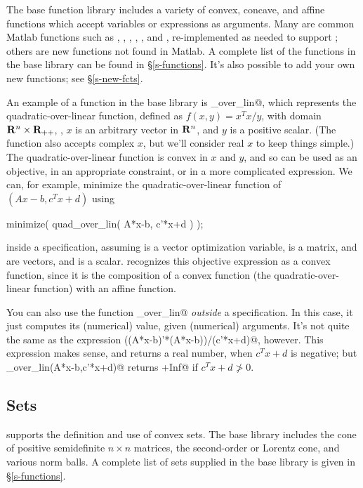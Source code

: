 \documentclass[12pt]{article}
\begin{document}
The base \cvx function library
includes a variety of convex, concave, and affine functions
which accept \cvx variables or expressions as arguments.
Many are common Matlab functions
such as \verb@sum@, \verb@trace@, \verb@diag@, \verb@sqrt@,
\verb@max@, and \verb@min@,
re-implemented as needed to support \cvx; others are new
functions not found in Matlab.
A complete list of the functions in the base library 
can be found in \S\ref{s-functions}.
It's also possible to add your own new functions;
see \S\ref{s-new-fcts}.

An example of a function in the base library is
\verb@quad_over_lin@, which represents the
quadratic-over-linear function, defined as $f(x,y)=x^Tx/y$,
with domain $\R^n \times \R_{++}$, \ie,
$x$ is an arbitrary vector in $\R^n$, and $y$ is a positive
scalar.  (The function also accepts
complex $x$, but we'll consider real $x$ to keep things simple.)
The quadratic-over-linear function is convex in 
$x$ and $y$, and so can be 
used as an objective, in an appropriate constraint, or in a 
more complicated expression.
We can, for example, minimize the quadratic-over-linear
function of $(Ax-b,c^Tx+d)$ using
\begin{code}
	minimize( quad_over_lin( A*x-b, c'*x+d ) );
\end{code}
inside a \cvx specification,
assuming \verb@x@ is a vector optimization variable,
\verb@A@ is a matrix, \verb@b@
and \verb@c@ are vectors, and \verb@d@ is a scalar.
\cvx recognizes this objective expression as a convex 
function, since it is
the composition of a convex function (the quadratic-over-linear
function) with an affine function.

You can also use the function \verb@quad_over_lin@ \emph{outside}
a \cvx specification.   In this case, it just computes its (numerical)
value, given (numerical) arguments.
It's not quite the same as the expression 
\verb@((A*x-b)'*(A*x-b))/(c'*x+d)@,
however.  This expression makes sense, and returns a real number, 
when $c^Tx+d$ is negative; but \verb@quad_over_lin(A*x-b,c'*x+d)@
returns \verb@+Inf@ if $c^Tx+d \not > 0$.

\subsection{Sets}
\label{sec:sets}

\cvx supports the definition and use of convex sets.
The base library includes the cone of 
positive semidefinite $n \times n$ matrices,
the second-order or Lorentz cone, and various norm balls.
A complete list of sets supplied in the base library is given in 
\S\ref{s-functions}.
\end{document}
